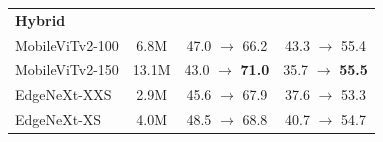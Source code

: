 \begin{table}[b]
\begin{tabular}{l c c c}
\midrule
\multicolumn{4}{l}{\textbf{Hybrid}} \\
\quad MobileViTv2-100             & 6.8M & 47.0 $\rightarrow$ 66.2          & 43.3 $\rightarrow$ 55.4 \\
\quad MobileViTv2-150             & 13.1M & 43.0 $\rightarrow$ \textbf{71.0}          & 35.7 $\rightarrow$ \textbf{55.5} \\
\quad EdgeNeXt-XXS                & 2.9M & 45.6 $\rightarrow$ 67.9          & 37.6 $\rightarrow$ 53.3 \\
\quad EdgeNeXt-XS                 & 4.0M & 48.5 $\rightarrow$ 68.8          & 40.7 $\rightarrow$ 54.7 \\
\bottomrule
\end{tabular}
\end{table}
